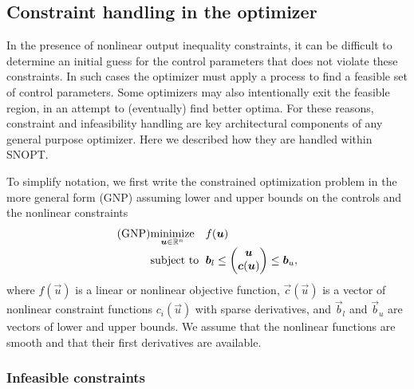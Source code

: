 \documentclass[twocolumn,numbook]{svjour3}          %
\makeatletter
\def\u{{\vec u}}
\def\c{{\vec c}}
\def\b{{\vec b}}
\def\A{{\vec A}}
\def\minim{\mathop{\hbox{\rm minimize}}}
\def\minimize#1{{\displaystyle\minim_{#1}}}
\def\subject{\mbox{\rm subject to}}
\def\strutl{\rule[-1.25ex]{0pt}{3ex}}%
\def\SNOPT {{\small SNOPT}}
\def\problem#1#2#3#4{%
   {\begin{tabular*}{0.47\textwidth}
    {@{}l@{\extracolsep{\fill}}l@{\extracolsep{6pt}}l@{\extracolsep{\fill}}c@{}}
      #1 & $\minimize{#2}$ & $#3$ & $ $ \\[5pt]
         & $\subject$      & $#4$ & $ $
    \end{tabular*}}}
\newcommand{\pmat}[1]{\begin{pmatrix}#1\end{pmatrix}}
\makeatother
\begin{document}



\subsection{Constraint handling in the optimizer} \label{sec:constr-opt}
In the presence of nonlinear output inequality constraints, 
it can be difficult to determine an initial guess for the control parameters that does 
not violate these constraints. In such cases
the optimizer must apply a process to find a feasible set of control parameters. Some optimizers may also intentionally exit the feasible region, in an attempt to (eventually) find better optima. For these reasons, constraint and infeasibility handling are key architectural components of any general purpose optimizer. Here we described how they are handled within \SNOPT{}. 

To simplify notation, we first write the constrained optimization problem in the more 
general form (GNP) assuming lower and upper bounds on the controls and the nonlinear
constraints
$$
   \problem{(GNP)}{\u \in \mathbb R^n}{f(\u)}
      {\b_l \le \pmat{\u\\\c(\u)\strutl} \le \b_u,}
$$
where $f(\u)$ is a linear or nonlinear objective function,
$\c(\u)$ is a vector of nonlinear constraint functions $c_i(\u)$
with sparse derivatives, and $\b_l$ and $\b_u$
are vectors of lower and upper bounds.
We assume that the nonlinear functions are smooth and that their first
derivatives are available.

\subsubsection{Infeasible constraints} \label{sec-infeas}
\end{document}
